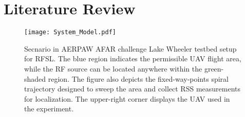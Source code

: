 \section{Literature Review}

\vspace{-0.1cm}

\begin{figure}
	\texttt{[image: System\_Model.pdf]}
	\centering
	\caption{Secnario in AERPAW AFAR challenge Lake Wheeler testbed setup for RFSL. The blue region indicates the permissible UAV flight area, while the RF source can be located anywhere within the green-shaded region. The figure also depicts the fixed-way-points spiral trajectory designed to sweep the area and collect RSS measurements for localization. The upper-right corner displays the UAV used in the experiment.}
	\label{Sys}
\vspace{-0.5cm}
\end{figure}